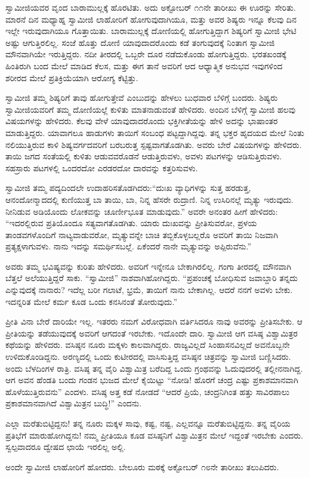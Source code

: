 \vskip 2pt

 ಸ್ವಾಮೀಜಿಯವರ ವೃಂದ ಬಾರಾಮುಲ್ಲಕ್ಕೆ ಹೊರಟಿತು. ಅದು ಅಕ್ಟೋಬರ್ ೧೧ನೇ ತಾರೀಖು ಈ ಊರನ್ನು ಸೇರಿತು. ಮಾರನೆ ದಿನ ಮಧ್ಯಾಹ್ನ ಸ್ವಾಮೀಜಿ ಲಾಹೋರಿಗೆ ಹೋಗುವುದಾಗಿಯೂ, ಮತ್ತು ಅವರ ಶಿಷ್ಯರು ಇನ್ನೂ ಕೆಲವು ದಿನ ಇಲ್ಲೇ ಇರುವುದಾಗಿಯೂ ಗೊತ್ತಾಯಿತು. ಬಾರಾಮುಲ್ಲಕ್ಕೆ ದೋಣಿಯಲ್ಲಿ ಹೋಗುತ್ತಿದ್ದಾಗ ಶಿಷ್ಯರಿಗೆ ಸ್ವಾಮೀಜಿ ಭೇಟಿ ಅಷ್ಟು ಆಗುತ್ತಿರಲಿಲ್ಲ. ಸಂಜೆ ಹೊತ್ತು ದೋಣಿ ಯಾವುದಾದರೊಂದು ಕಡೆ ತಂಗುವುದಕ್ಕೆ ನಿಂತಾಗ ಸ್ವಾಮೀಜಿ ಮೌನವಾಗಿಯೇ ಇರುತ್ತಿದ್ದರು. ನದೀ ತೀರದಲ್ಲಿ ಒಬ್ಬರೇ ದೂರ ನಡೆದುಕೊಂಡು ಹೋಗುತ್ತಿದ್ದರು. ಭರತಖಂಡಕ್ಕೆ ಹಿಂತಿರುಗಿ ಬಂದ ಮೇಲೆ ಮಾಡಿದ ಕೆಲಸ, ಮತ್ತು ಈಗ ತಾನೆ ಅವರಿಗೆ ಆದ ಆಧ್ಯಾತ್ಮಿಕ ಅನುಭವ ಇವುಗಳಿಂದ ಶರೀರದ ಮೇಲೆ ಪ್ರತಿಕ್ರಿಯೆಯಾಗಿ ಆರೋಗ್ಯ ಕೆಟ್ಟಿತ್ತು. 

\vskip 2pt

 ಸ್ವಾಮೀಜಿ ತಮ್ಮ ಶಿಷ್ಯರಿಗೆ ತಾವು ಹೋಗುತ್ತೇವೆ ಎಂಬುದನ್ನು ಹೇಳಲು ಬುಧವಾರ ಬೆಳಿಗ್ಗೆ ಬಂದರು. ಶಿಷ್ಯರು ಸ್ವಾಮೀಜಿಯವರಿಗೆ ತಮ್ಮ ದೋಣಿಯಲ್ಲೆ ಕುಳಿತು ಮಾತನಾಡುವಂತೆ ಹೇಳಿದರು. ಅಂದಿನ ಬೆಳಿಗ್ಗೆ ಸ್ವಾಮೀಜಿ ಹಲವು ವಿಷಯಗಳನ್ನು ಹೇಳಿದರು. ಕೆಲವು ವೇಳೆ ಯಾವುದಾದರೊಂದು ಭಕ್ತಿಗೀತೆಯನ್ನು ಹೇಳಿ ಅದನ್ನು ಭಾಷಾಂತರ ಮಾಡುತ್ತಿದ್ದರು. ಯಾವಾಗಲೂ ಹಾಡುಗಳು ತಾಯಿಗೆ ಸಂಬಂಧ ಪಟ್ಟದ್ದಾಗಿದ್ದವು. ತನ್ನ ಭಕ್ತರ ಹೃದಯದ ಮೇಲೆ ನಿಂತು ನಲಿಯುತ್ತಿರುವ ಕಾಳಿ ಶಿಷ್ಯವರ್ಗದವರಿಗೆ ಬರಬರುತ್ತ ಸ್ಪಷ್ಟವಾಗತೊಡಗಿತು. ಅವರು ಬೇರೆ ವಿಷಯಗಳನ್ನು ಹೇಳಿದರು. ತಾಯಿ ಜಗದ ಸಂತೆಯಲ್ಲಿ ಕುಳಿತು ಆಡುವವರೊಡನೆ ಆಡುತ್ತಿರುವಳು, ಅವಳು ಪಟಗಳನ್ನು ಆಡಿಸುತ್ತಿರುವಳು. ಸಹಸ್ರಾರು ಪಟಗಳಲ್ಲಿ ಒಂದರದೋ ಎರಡರದೋ ದಾರವನ್ನು ಕತ್ತರಿಸುವಳು. 

\vskip 2pt

 ಸ್ವಾಮೀಜಿ ತಮ್ಮ ಪದ್ಯದಿಂದಲೇ ಉದಾಹರಿಸತೊಡಗಿದರು:“ದುಃಖ ವ್ಯಾಧಿಗಳನ್ನು ಸುತ್ತ ಹರಡುತ್ತ, ಆನಂದೋನ್ಮಾದದಲ್ಲಿ ಕುಣಿಯುತ್ತ ಬಾ ತಾಯಿ, ಬಾ, ನಿನ್ನ ಹೆಸರೇ ರುದ್ರಾಣಿ. ನಿನ್ನ ಉಸಿರಿನಲ್ಲೆ ಮೃತ್ಯು ಇರುವುದು. ನೀನಿಡುವ ಅಡಿಯೊಂದು ಲೋಕವನ್ನು ಚೂರ್ಣೀಭೂತ ಮಾಡುವುದು.” ಅವರೇ ಅನಂತರ ಹೀಗೆ ಹೇಳಿದರು: “ಇದರಲ್ಲಿರುವ ಪ್ರತಿಯೊಂದೂ ಸತ್ಯವಾಗತೊಡಗಿತು. ಯಾರು ದುಃಖವನ್ನು ಪ್ರೀತಿಸುವರೋ, ಪ್ರಳಯ ತಾಂಡವಗಳೊಂದಿಗೆ ನಾಟ್ಯವಾಡುವರೋ, ಮೃತ್ಯುವನ್ನೇ ಬಾಚಿ ತಬ್ಬಿಕೊಳ್ಳಬಲ್ಲರೊ ಅವರಿಗೆ ತಾಯಿ ನಿಜವಾಗಿ ಪ್ರತ್ಯಕ್ಷಳಾಗುವಳು. ನಾನು ಇದನ್ನು ಸಮರ್ಥಿಸಬಲ್ಲೆ. ಏಕೆಂದರೆ ನಾನೇ ಮೃತ್ಯುವನ್ನು ಅಪ್ಪಿರುವೆನು.” 

 ಅವರು ತಮ್ಮ ಭವಿಷ್ಯವನ್ನು ಕುರಿತು ಹೇಳಿದರು. ಅವರಿಗೆ ಇನ್ನೇನೂ ಬೇಕಾಗಿರಲಿಲ್ಲ. ಗಂಗಾ ತೀರದಲ್ಲಿ ಮೌನವಾಗಿ ಬೆತ್ತಲೆ ಅಲೆಯುತ್ತಿದ್ದರೆ ಸಾಕು. “ಸ್ವಾಮೀಜಿ” ನಾಶವಾಗಿಹೋಗಿದ್ದರು. “ಪ್ರಪಂಚಕ್ಕೆ ಬೋಧಿಸುವ ಜವಾಬ್ದಾರಿ ತನ್ನದು ಎನ್ನುವುದಕ್ಕೆ ನಾನಾರು? ಇದೆಲ್ಲ ಬರೀ ಗಲಾಟೆ, ಭ್ರಮೆ, ತಾಯಿಗೆ ನಾನು ಬೇಕಾಗಿಲ್ಲ. ಆದರೆ ನನಗೆ ಅವಳು ಬೇಕು. ಇದನ್ನರಿತ ಮೇಲೆ ಕರ್ಮ ಕೂಡ ಒಂದು ಕನಸಿನಂತೆ ತೋರುವುದು.” 

 ಪ್ರೀತಿ ವಿನಾ ಬೇರೆ ದಾರಿಯೇ ಇಲ್ಲ. ಇತರರು ನಮಗೆ ವಿರೋಧವಾಗಿ ವರ್ತಿಸಿದರೂ ನಾವು ಅವರನ್ನು ಪ್ರೀತಿಸಬೇಕು. ಆ ಪ್ರೀತಿಯನ್ನು ತಡೆಯುವುದಕ್ಕೆ ಅವರಿಗೆ ಆಗದಂತೆ ಇರಬೇಕು. ಇದೊಂದೇ ದಾರಿ. ಸ್ವಾಮೀಜಿ ಆಗ ವಸಿಷ್ಠ ವಿಶ್ವಾಮಿತ್ರರ ಕಥೆಯನ್ನು ಹೇಳಿದರು. ವಸಿಷ್ಠನ ನೂರು ಮಕ್ಕಳು ಕಾಲವಾಗಿದ್ದರು. ರಾಜ್ಯವಿಲ್ಲದೆ ಸಿಂಹಾಸನವಿಲ್ಲದೆ ಅವನೊಬ್ಬನೇ ಉಳಿದುಕೊಂಡಿದ್ದನು. ಅರಣ್ಯದಲ್ಲಿ ಒಂದು ಕುಟೀರದಲ್ಲಿ ವಾಸಿಸುತ್ತಿದ್ದ ವಸಿಷ್ಠನ ಚಿತ್ರವನ್ನು ಸ್ವಾಮೀಜಿ ಬಣ್ಣಿಸಿದರು. ಅಂದು ಬೆಳದಿಂಗಳ ರಾತ್ರಿ. ವಸಿಷ್ಠ ತನ್ನ ವೈರಿ ವಿಶ್ವಾಮಿತ್ರ ಬರೆದಿದ್ದ ಒಂದು ಗ್ರಂಥವನ್ನು ಓದುವುದರಲ್ಲಿ ತಲ್ಲೀನನಾಗಿದ್ದ. ಆಗ ಅವನ ಹೆಂಡತಿ ಬಂದು ಗಂಡನ ಭುಜದ ಮೇಲೆ ಕೈಯಿಟ್ಟು “ನೋಡಿ! ಹೊರಗೆ ಚಂದ್ರ ಎಷ್ಟು ಪ್ರಕಾಶಮಾನವಾಗಿ ಹೊಳೆಯುತ್ತಿರುವನು” ಎಂದಳು. ವಸಿಷ್ಠ ಅತ್ತ ಕಡೆ ನೋಡದೆ “ಆದರೆ ಪ್ರಿಯೆ, ಚಂದ್ರನಿಗಿಂತ ಹತ್ತು ಸಾವಿರಪಾಲು ಪ್ರಕಾಶಮಾನವಾಗಿದೆ ವಿಶ್ವಾಮಿತ್ರನ ಬುದ್ಧಿ!” ಎಂದನು. 

 ಎಲ್ಲಾ ಮರೆತುಬಿಟ್ಟಿದ್ದನು! ತನ್ನ ನೂರು ಮಕ್ಕಳ ಸಾವು, ಕಷ್ಟ, ನಷ್ಟ, ಎಲ್ಲವನ್ನೂ ಮರೆತುಬಿಟ್ಟಿದ್ದನು. ತನ್ನ ವೈರಿಯ ಪ್ರತಿಭೆಗೆ ಮಾರುಹೋಗಿದ್ದನು! ನಮ್ಮ ಪ್ರೀತಿಯೂ ಕೂಡ ವಸಿಷ್ಠನಿಗೆ ವಿಶ್ವಾಮಿತ್ರನ ಮೇಲೆ ಇದ್ದಂತೆ ಇರಬೇಕು ಎಂದರು. ಸ್ವಲ್ಪವಾದರೂ ದ್ವೇಷದ ಛಾಯೆ ಇರಲಿಲ್ಲ ಅಲ್ಲಿ. 

 ಅಂದೇ ಸ್ವಾಮೀಜಿ ಲಾಹೋರಿಗೆ ಹೋದರು. ಬೇಲೂರು ಮಠಕ್ಕೆ ಅಕ್ಟೋಬರ್ ೧೮ನೇ ತಾರೀಖು ತಲುಪಿದರು. 

